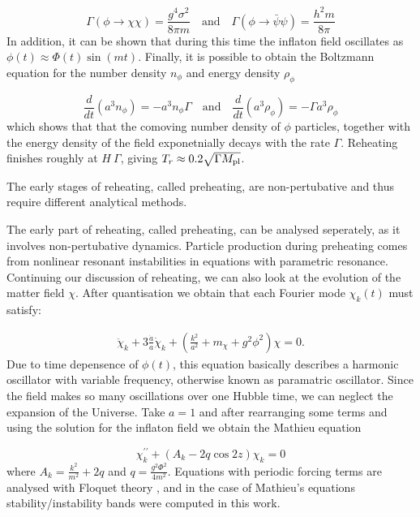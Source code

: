 \begin{equation}
    \Gamma(\phi \rightarrow \chi \chi) = \frac{g^4 \sigma^2}{8 \pi m} \quad \text{and} \quad \Gamma(\phi \rightarrow \bar{\psi} \psi) = \frac{h^2 m }{8 \pi}
\end{equation}
In addition, it can be shown that during this time the inflaton field oscillates as $\phi(t) \approx \Phi(t) \sin (mt)$. Finally, it is possible to obtain the Boltzmann equation for the number density $n_{\phi}$ and energy density $\rho_{\phi}$

\begin{equation}
    \frac{d}{dt} (a^3 n_{\phi}) = -a^3 n_{\phi} \Gamma \quad \text{and} \quad \frac{d}{dt} (a^3 \rho_{\phi}) = - \Gamma a^3 \rho_{\phi}
\end{equation}
which shows that that the comoving number density of $\phi$ particles, together with the energy density of the field exponetnially decays with the rate $\Gamma$. Reheating finishes roughly at $H ~ \Gamma$, giving $T_r \approx 0.2 \sqrt{\Gamma M_{\rm pl}}$. 

The early stages of reheating, called preheating, are non-pertubative and thus require different analytical methods.

The early part of reheating, called preheating, can be analysed seperately, as it involves non-pertubative dynamics. Particle production during preheating comes from nonlinear resonant instabilities in equations with parametric resonance. Continuing our discussion of reheating, we can also look at the evolution of the matter field $\chi$. After quantisation we obtain that each Fourier mode $\chi_k(t)$ must satisfy:

\begin{eqnarray}
    \ddot{\chi}_k + 3 \frac{\dot{a}}{a}\dot{\chi}_k + \left( \frac{k^2}{a^2} + m_{\chi} + g^2 \phi^2 \right) \chi = 0.
\end{eqnarray}
Due to time depensence of $\phi(t)$, this equation basically describes a harmonic oscillator with variable frequency, otherwise known as paramatric oscillator. Since the field makes so many oscillations over one Hubble time, we can neglect the expansion of the Universe. Take $a=1$ and after rearranging some terms and using the solution for the inflaton field we obtain the Mathieu equation

\begin{equation}
    \chi_k^{\prime \prime} + (A_k - 2 q \cos 2 z) \chi_k = 0
\end{equation}
where $A_k = \frac{k^2}{m^2} + 2q$ and $q = \frac{g^2 \Phi^2}{4 m^2}$. Equations with periodic forcing terms are analysed with Floquet theory \cite{brown2012floquet}, and in the case of Mathieu's equations stability/instability bands were computed in this work.

